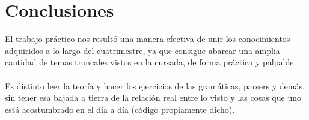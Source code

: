 \section{Conclusiones}

El trabajo práctico nos resultó una manera efectiva de unir los conocimientos adquiridos a lo largo del cuatrimestre, ya que consigue abarcar una amplia cantidad de temas troncales vistos en la cursada, de forma práctica y palpable. \\
\\
\indent Es distinto leer la teoría y hacer los ejercicios de las gramáticas, parsers y demás, sin tener esa bajada a tierra de la relación real entre lo visto y las cosas que uno está acostumbrado en el día a día (código propiamente dicho). \\
\\

\clearpage
